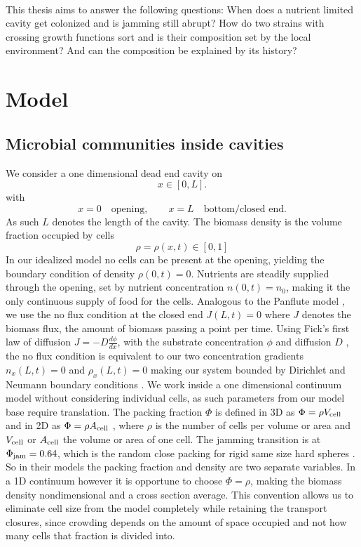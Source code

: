 \documentclass[11pt,a4paper]{report}
\begin{document}
	\\
	This thesis aims to answer the following questions: When does a nutrient limited cavity get colonized and is jamming still abrupt? How do two strains with crossing growth functions sort and is their composition set by the local environment? And can the composition be explained by its history?
	\chapter{Model}
	\label{model}
	\section{Microbial communities inside cavities}
	We consider a one dimensional dead end cavity on
	\begin{equation}
		x\in[0,L].
	\end{equation}
	with
	\begin{equation}
		x=0 \quad \text{opening},
		\qquad
		x=L \quad \text{bottom/closed end}.
	\end{equation}
	As such $L$ denotes the length of the cavity. The biomass density is the volume fraction occupied by cells
	\begin{equation}
		\rho=\rho(x,t)\in[0,1]
	\end{equation}
	In our idealized model no cells can be present at the opening, yielding the boundary condition of density $\rho(0,t)=0$. Nutrients are steadily supplied through the opening, set by nutrient concentration $n(0,t)=n_0$, making it the only continuous supply of food for the cells. Analogous to the Panflute model \cite{Karita}, we use the no flux condition at the closed end $J(L,t)=0$ where $J$ denotes the biomass flux, the amount of biomass passing a point per time. Using Fick's first law of diffusion $J=-D\frac{d\phi}{dx}$, with the substrate concentration $\phi$ and diffusion $D$ \cite{Fick}, the no flux condition is equivalent to our two concentration gradients $n_x (L,t)=0$ and $\rho_x (L,t)=0$ making our system bounded by Dirichlet and Neumann boundary conditions \cite{Leveque}.
	We work inside a one dimensional continuum model without considering individual cells, as such parameters from our model base \cite{Karita, slepukhin} require translation. The packing fraction $\Phi$ is defined in 3D as $\Phi=\rho V_{\rm cell}$ \cite{Karita} and in 2D as $\Phi=\rho A_{\rm cell}$ \cite{slepukhin}, where $\rho$ is the number of cells per volume or area and $V_{\rm cell}$ or $A_{\rm cell}$ the volume or area of one cell. The jamming transition is at $\Phi_{\rm jam}=0.64$, which is the random close packing for rigid same size hard spheres \cite{Karita}. So in their models the packing fraction and density are two separate variables. In a 1D continuum however it is opportune to choose $\Phi=\rho$, making the biomass density nondimensional and a cross section average. This convention allows us to eliminate cell size from the model completely while retaining the transport closures, since crowding depends on the amount of space occupied and not how many cells that fraction is divided into.\\
\end{document}
